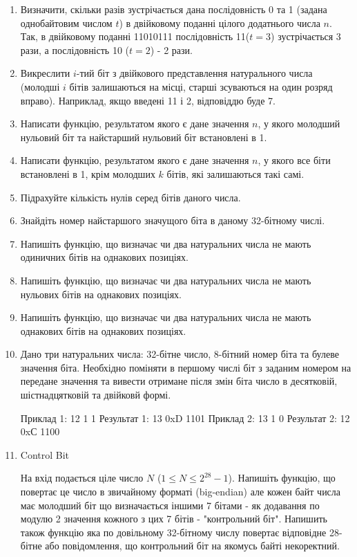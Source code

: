 \documentclass[]{article}
\begin{document}
\begin{enumerate}
\item Визначити, скільки разів зустрічається дана послідовність 0 та 1 (задана однобайтовим числом $t$) 
в двійковому поданні цілого додатнього числа $n$. Так, в двійковому поданні 11010111 послідовність 11($t=3$) зустрічається 3 рази, 
а послідовність 10 ($t=2$) - 2 рази.
\item
  Викреслити $i$-тий біт з двійкового представлення натурального числа
  (молодші $i$ бітів залишаються на місці, старші зсуваються на один
  розряд вправо). Наприклад, якщо введені 11 і 2, відповіддю буде 7.
\item
  Написати функцію, результатом якого є дане значення $n$, у якого 
молодший нульовий біт та найстарший нульовий біт встановлені в 1.
\item
  Написати функцію, результатом якого є дане значення $n$, у якого все
  біти встановлені в 1, крім молодших $k$ бітів, які залишаються такі самі.
\item
  Підрахуйте кількість нулів серед бітів даного числа.
\item
  Знайдіть номер найстаршого значущого біта в даному 32-бітному числі.
\item
  Напишіть функцію, що визначає чи два натуральних числа не мають
  одиничних бітів на однакових позиціях.
\item
  Напишіть функцію, що визначає чи два натуральних числа не мають
  нульових бітів на однакових позиціях.
\item
  Напишіть функцію, що визначає чи два натуральних числа не мають
  однакових бітів на однакових позиціях.
\item
 Дано три натуральних числа: 32-бітне число, 8-бітний номер біта та булеве значення біта.
Необхідно поміняти в першому числі біт з заданим номером на передане значення та 
вивести отримане після змін біта число в десятковій, шістнадцятковій та двійковй формі.

Приклад 1: 
12 1 1 
Результат 1:
13 0xD 1101 
Приклад 2:
13 1 0
Результат 2:
12 0xС 1100

\item Control Bit

На вхід подається ціле число $N $ ($1\le N \le 2^{28}-1 $).
Напишіть функцію, що повертає це число в звичайному форматі (big-endian) але
кожен байт числа має молодший біт що визначається іншими 7 бітами -
як додавання по модулю 2 значення кожного з цих 7 бітів - "контрольний біт".
Напишить також функцію яка по довільному 32-бітному числу повертає відповідне 28-бітне
або повідомлення, що контрольний біт на якомусь байті некоректний.


\end{enumerate}
\end{document}
